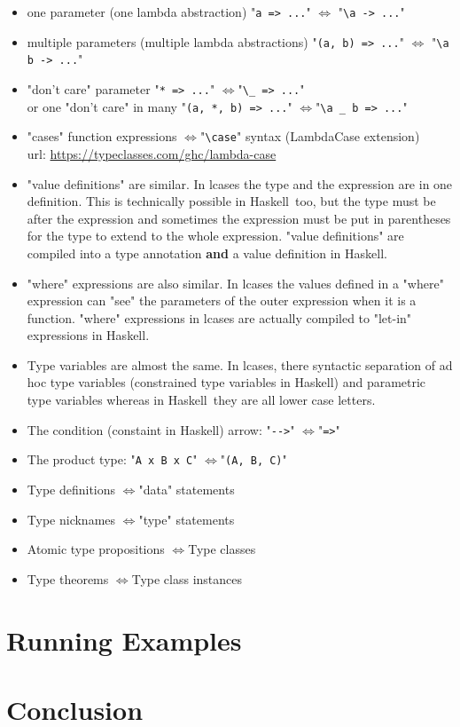 \documentclass{article}
\def\H{Haskell}
\def\r{$\Longleftrightarrow$}
\begin{document}
\begin{itemize}
\item
one parameter (one lambda abstraction) "\verb|a => ...|" \r
"\verb|\a -> ...|"

\item
multiple parameters (multiple lambda abstractions) "\verb|(a, b) => ...|" \r
"\verb|\a b -> ...|"

\item
"don't care" parameter
"\verb|* => ...|" \r "\verb|\_ => ...|"
\\
or one "don't care" in many
"\verb|(a, *, b) => ...|" \r "\verb|\a _ b => ...|"

\item
"cases" function expressions \r "\verb|\case|" syntax
(LambdaCase extension) \\
url: \url{https://typeclasses.com/ghc/lambda-case}

\item
"value definitions" are similar. In lcases the type and the expression are in
one definition. This is technically possible in \H\ too, but the type must be
after the expression and sometimes the expression must be put in parentheses
for the type to extend to the whole expression. "value definitions" are
compiled into a type annotation \textbf{and} a value definition in \H.

\item
"where" expressions are also similar. In lcases the values defined in a
"where" expression can "see" the parameters of the outer expression when
it is a function. "where" expressions in lcases are actually compiled to
"let-in" expressions in \H.

\item
Type variables are almost the same. In lcases, there syntactic separation of ad
hoc type variables (constrained type variables in \H) and parametric type
variables whereas in \H\ they are all lower case letters.

\item
The condition (constaint in \H) arrow: "\verb|-->|" \r "\verb|=>|"

\item
The product type: "\verb|A x B x C|" \r "\verb|(A, B, C)|"

\item
Type definitions \r "data" statements

\item
Type nicknames \r "type" statements

\item
Atomic type propositions \r Type classes

\item
Type theorems \r Type class instances

\end{itemize}

\section{Running Examples}

\section{Conclusion}

\newpage
\printbibliography
\end{document}
